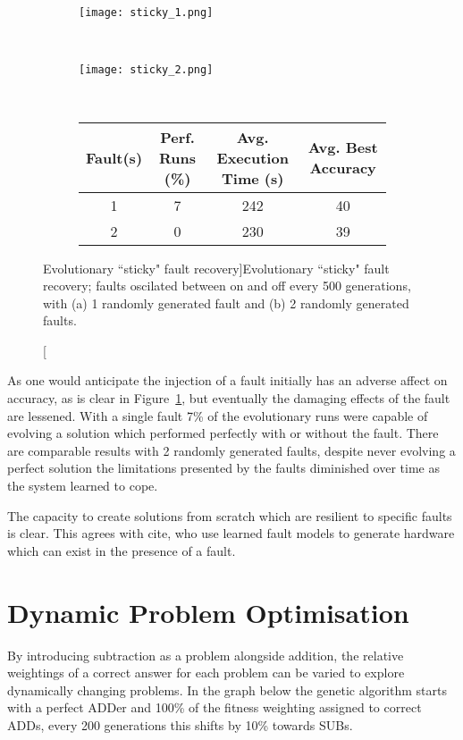 \begin{figure}
	\centering
	\begin{subfigure}[ht]{0.49\textwidth}
		\texttt{[image: sticky\_1.png]}
		\caption{}
		\vspace{1em}
	\end{subfigure}
	~
	\begin{subfigure}[ht]{0.49\textwidth}
		\texttt{[image: sticky\_2.png]}
		\caption{}
		\vspace{1em}
	\end{subfigure}
	~
	\begin{subfigure}[ht]{\textwidth}
		\centering
		\begin{tabular}{cccc}
			\toprule
			\bfseries{Fault(s)} & \bfseries{Perf. Runs (\%)} &
			\bfseries{Avg. Execution Time (s)} & \bfseries{Avg. Best Accuracy}\\
			\midrule
			1 & 7 & 242 & 40 \\
			2 & 0 & 230 & 39 \\
			\bottomrule
		\end{tabular}
	\end{subfigure}
	\caption[Evolutionary ``sticky" fault recovery]{Evolutionary ``sticky"
		fault recovery; faults oscilated between on and off every 500
		generations, with
		(a) 1 randomly generated fault and (b) 2 randomly generated
	faults.}
	\label{fig:sticky}
\end{figure}

As one would anticipate the injection of a fault initially has an adverse affect on
accuracy, as is clear in Figure~\ref{fig:sticky}, but eventually the damaging effects
of the fault are lessened. With a single fault 7\% of the evolutionary runs
were capable of evolving a solution which performed perfectly with or without
the fault. There are comparable results with 2 randomly generated faults, despite
never evolving a perfect solution the limitations presented by the faults diminished
over time as the system learned to cope.

The capacity to create solutions from scratch which are resilient to specific faults
is clear. This agrees with \todo cite, who use learned fault models to generate
hardware which can exist in the presence of a fault.

\section{Dynamic Problem Optimisation}
By introducing subtraction as a problem alongside addition, the relative weightings of a correct answer for each problem can be varied to explore dynamically changing problems. In the graph below the genetic algorithm starts with a perfect ADDer and 100\% of the fitness weighting assigned to correct ADDs, every 200 generations this shifts by 10\% towards SUBs.

